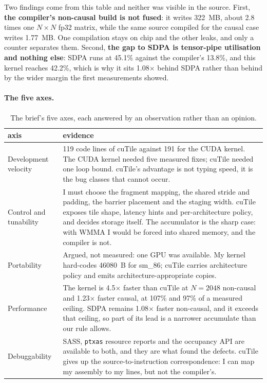 \documentclass[10pt,a4paper]{article}
\begin{document}
Two findings come from this table and neither was visible in the source. First, \textbf{the compiler's
non-causal build is not fused}: it writes \SI{322}{MB}, about 2.8 times one $N\times N$ fp32 matrix,
while the same source compiled for the causal case writes \SI{1.77}{MB}. One compilation stays on chip
and the other leaks, and only a counter separates them. Second, \textbf{the gap to SDPA is tensor-pipe
utilisation and nothing else}: SDPA runs at 45.1\% against the compiler's 13.8\%, and this kernel
reaches 42.2\%, which is why it sits 1.08$\times$ behind SDPA rather than behind by the wider margin
the first measurements showed.

\paragraph{The five axes.}

\begin{table}[H]
\centering\small
\caption{The brief's five axes, each answered by an observation rather than an opinion.}
\label{tab:axes}
\begin{tabular}{@{}p{2.6cm}p{13.4cm}@{}}
\toprule
axis & evidence \\
\midrule
Development velocity & 119 code lines of cuTile against 191 for the CUDA kernel. The CUDA kernel needed
five measured fixes; cuTile needed one loop bound. cuTile's advantage is not typing speed, it is the bug
classes that cannot occur. \\
Control and tunability & I must choose the fragment mapping, the shared stride and padding, the barrier
placement and the staging width. cuTile exposes tile shape, latency hints and per-architecture policy,
and decides storage itself. The accumulator is the sharp case: with WMMA I would be forced into shared
memory, and the compiler is not. \\
Portability & Argued, not measured: one GPU was available. My kernel hard-codes 46080~B for sm\_86;
cuTile carries architecture policy and emits architecture-appropriate copies. \\
Performance & The kernel is 4.5$\times$ faster than cuTile at $N{=}2048$ non-causal and 1.23$\times$
faster causal, at 107\% and 97\% of a measured ceiling. SDPA remains 1.08$\times$ faster non-causal, and
it exceeds that ceiling, so part of its lead is a narrower accumulate than our rule allows. \\
Debuggability & SASS, \texttt{ptxas} resource reports and the occupancy API are available to both, and
they are what found the defects. cuTile gives up the source-to-instruction correspondence: I can map my
assembly to my lines, but not the compiler's. \\
\bottomrule
\end{tabular}
\end{table}
\end{document}
